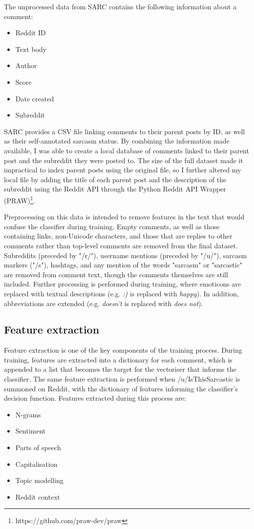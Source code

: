 \documentclass[a4paper,12pt]{article}
\begin{document}
The unprocessed data from SARC contains the following information about a comment:
\begin{itemize}
  \item Reddit ID
  \item Text body
  \item Author
  \item Score
  \item Date created
  \item Subreddit
\end{itemize}
SARC provides a CSV file linking comments to their parent posts by ID, as well as their self-annotated sarcasm status. By combining the information made available, I was able to create a local database of comments linked to their parent post and the subreddit they were posted to. The size of the full dataset made it impractical to index parent posts using the original file, so I further altered my local file by adding the title of each parent post and the description of the subreddit using the Reddit API through the Python Reddit API Wrapper (PRAW)\footnote{https://github.com/praw-dev/praw}.

Preprocessing on this data is intended to remove features in the text that would confuse the classifier during training. Empty comments, as well as those containing links, non-Unicode characters, and those that are replies to other comments rather than top-level comments are removed from the final dataset. Subreddits (preceded by "/r/"), username mentions (preceded by "/u/"), sarcasm markers ("/s"), hashtags, and any mention of the words "sarcasm" or "sarcastic" are removed from comment text, though the comments themselves are still included. Further processing is performed during training, where emoticons are replaced with textual descriptions (e.g. \textit{:)} is replaced with \textit{happy}). In addition, abbreviations are extended (e.g. \textit{doesn't} is replaced with \textit{does not}).

\subsection{Feature extraction}
Feature extraction is one of the key components of the training process. During training, features are extracted into a dictionary for each comment, which is appended to a list that becomes the target for the vectoriser that informs the classifier. The same feature extraction is performed when /u/IsThisSarcastic is summoned on Reddit, with the dictionary of features informing the classifier's decision function.
\newpage
Features extracted during this process are:
\begin{itemize}
  \item N-grams
  \item Sentiment
  \item Parts of speech
  \item Capitalisation
  \item Topic modelling
  \item Reddit context
\end{itemize}
\end{document}
